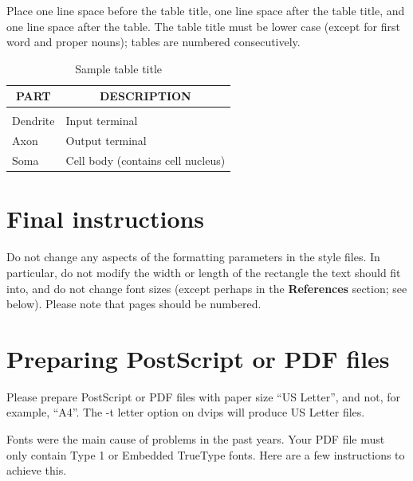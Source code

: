 \documentclass{article} %
\begin{document}
Place one line space before the table title, one line space after the table
title, and one line space after the table. The table title must be lower case
(except for first word and proper nouns); tables are numbered consecutively.

\begin{table}[t]
\caption{Sample table title}
\label{sample-table}
\begin{center}
\begin{tabular}{ll}
\multicolumn{1}{c}{\bf PART}  &\multicolumn{1}{c}{\bf DESCRIPTION}
\\ \hline \\
Dendrite         &Input terminal \\
Axon             &Output terminal \\
Soma             &Cell body (contains cell nucleus) \\
\end{tabular}
\end{center}
\end{table}

\section{Final instructions}
Do not change any aspects of the formatting parameters in the style files.
In particular, do not modify the width or length of the rectangle the text
should fit into, and do not change font sizes (except perhaps in the
\textbf{References} section; see below). Please note that pages should be
numbered.

\section{Preparing PostScript or PDF files}

Please prepare PostScript or PDF files with paper size ``US Letter'', and
not, for example, ``A4''. The -t
letter option on dvips will produce US Letter files.

Fonts were the main cause of problems in the past years. Your PDF file must
only contain Type 1 or Embedded TrueType fonts. Here are a few instructions
to achieve this.
\end{document}
